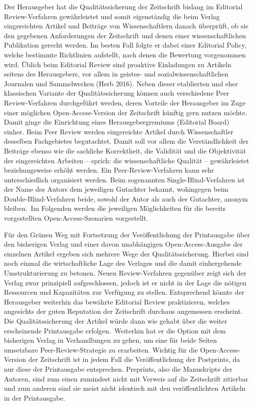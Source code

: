 \documentclass[a4paper,
fontsize=11pt,
oneside,
numbers=noperiodatend,
parskip=half-,
bibliography=totoc,
final
]{scrartcl}
\begin{document}
Der Herausgeber hat die Qualitätssicherung der Zeitschrift bislang im
Editorial Review-Verfahren gewährleistet und somit eigenständig die beim
Verlag eingereichten Artikel und Beiträge von Wissenschaftlern danach
überprüft, ob sie den gegebenen Anforderungen der Zeitschrift und denen
einer wissenschaftlichen Publikation gerecht werden. Im besten Fall
folgte er dabei einer Editorial Policy, welche bestimmte Richtlinien
aufstellt, nach denen die Bewertung vorgenommen wird. Üblich beim
Editorial Review sind proaktive Einladungen zu Artikeln seitens des
Herausgebers, vor allem in geistes- und sozialwissenschaftlichen
Journalen und Sammelwerken (Herb 2016). Neben dieser etablierten und
eher klassischen Variante der Qualitätssicherung können auch
verschiedene Peer Review-Verfahren durchgeführt werden, deren Vorteile
der Herausgeber im Zuge einer möglichen Open-Access-Version der
Zeitschrift künftig gern nutzen möchte. Damit ginge die Einrichtung
eines Herausgebergremiums (Editorial Board) einher. Beim Peer Review
werden eingereichte Artikel durch Wissenschaftler desselben Fachgebietes
begutachtet. Damit soll vor allem die Verständlichkeit der Beiträge
ebenso wie die sachliche Korrektheit, die Validität und die Objektivität
der eingereichten Arbeiten -- sprich: die wissenschaftliche Qualität --
gewährleistet beziehungsweise erhöht werden. Ein Peer-Review-Verfahren
kann sehr unterschiedlich organisiert werden. Beim sogenannten
Single-Blind-Verfahren ist der Name des Autors dem jeweiligen Gutachter
bekannt, wohingegen beim Double-Blind-Verfahren beide, sowohl der Autor
als auch der Gutachter, anonym bleiben.~Im Folgenden werden die
jeweiligen Möglichkeiten für die bereits vorgestellten
Open-Access-Szenarien vorgestellt.

Für den Grünen Weg mit Fortsetzung der Veröffentlichung der Printausgabe
über den bisherigen Verlag und einer davon unabhängigen
Open-Access-Ausgabe der einzelnen Artikel ergeben sich mehrere Wege der
Qualitätssicherung. Hierbei sind noch einmal die wirtschaftliche Lage
des Verlages und die damit einhergehende Umstrukturierung zu betonen.
Neuen Review-Verfahren gegenüber zeigt sich der Verlag zwar prinzipiell
aufgeschlossen, jedoch ist er nicht in der Lage die nötigen Ressourcen
und Kapazitäten zur Verfügung zu stellen. Entsprechend könnte der
Herausgeber weiterhin das bewährte Editorial Review praktizieren,
welches angesichts der guten Reputation der Zeitschrift durchaus
angemessen erscheint. Die Qualitätssicherung der Artikel würde dann wie
gehabt über die weiter erscheinende Printausgabe erfolgen.~Weiterhin hat
er die Option mit dem bisherigen Verlag in Verhandlungen zu gehen, um
eine für beide Seiten umsetzbare Peer-Review-Strategie zu erarbeiten.
Wichtig für die Open-Access-Version der Zeitschrift ist in jedem Fall
die Veröffentlichung der Postprints, da nur diese der Printausgabe
entsprechen. Preprints, also die Manuskripte der Autoren, sind zum einen
zumindest nicht mit Verweis auf die Zeitschrift zitierbar und zum
anderen sind sie meist nicht identisch mit den veröffentlichten Artikeln
in der Printausgabe.
\end{document}
